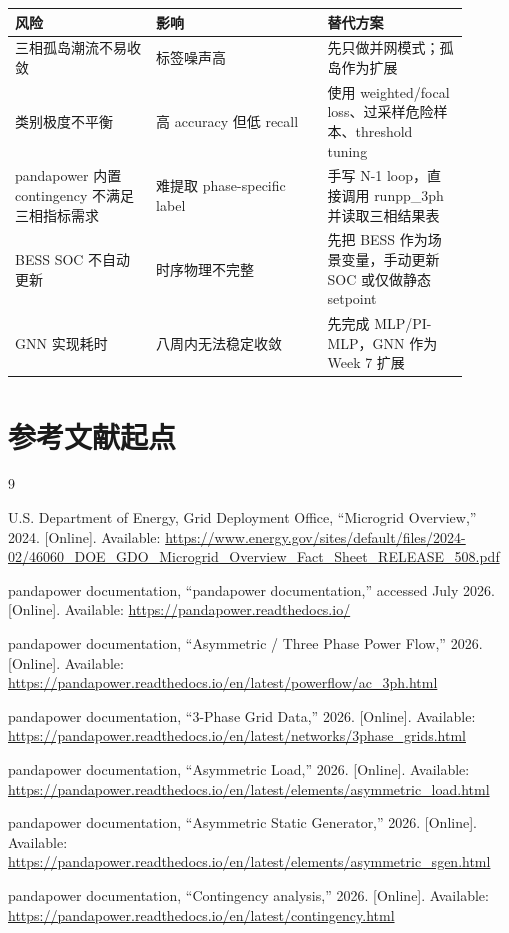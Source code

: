 \documentclass[UTF8,11pt]{ctexart}
\begin{document}
\begin{center}
\begin{tabular}{>{\raggedright\arraybackslash}p{0.28\linewidth}>{\raggedright\arraybackslash}p{0.34\linewidth}>{\raggedright\arraybackslash}p{0.28\linewidth}}
\toprule
风险 & 影响 & 替代方案 \\
\midrule
三相孤岛潮流不易收敛 & 标签噪声高 & 先只做并网模式；孤岛作为扩展 \\
类别极度不平衡 & 高 accuracy 但低 recall & 使用 weighted/focal loss、过采样危险样本、threshold tuning \\
pandapower 内置 contingency 不满足三相指标需求 & 难提取 phase-specific label & 手写 N-1 loop，直接调用 runpp\_3ph 并读取三相结果表 \\
BESS SOC 不自动更新 & 时序物理不完整 & 先把 BESS 作为场景变量，手动更新 SOC 或仅做静态 setpoint \\
GNN 实现耗时 & 八周内无法稳定收敛 & 先完成 MLP/PI-MLP，GNN 作为 Week 7 扩展 \\
\bottomrule
\end{tabular}
\end{center}

\section{参考文献起点}

\begin{thebibliography}{9}

U.S. Department of Energy, Grid Deployment Office, ``Microgrid Overview,'' 2024. [Online]. Available: \url{https://www.energy.gov/sites/default/files/2024-02/46060_DOE_GDO_Microgrid_Overview_Fact_Sheet_RELEASE_508.pdf}

pandapower documentation, ``pandapower documentation,'' accessed July 2026. [Online]. Available: \url{https://pandapower.readthedocs.io/}

pandapower documentation, ``Asymmetric / Three Phase Power Flow,'' 2026. [Online]. Available: \url{https://pandapower.readthedocs.io/en/latest/powerflow/ac_3ph.html}

pandapower documentation, ``3-Phase Grid Data,'' 2026. [Online]. Available: \url{https://pandapower.readthedocs.io/en/latest/networks/3phase_grids.html}

pandapower documentation, ``Asymmetric Load,'' 2026. [Online]. Available: \url{https://pandapower.readthedocs.io/en/latest/elements/asymmetric_load.html}

pandapower documentation, ``Asymmetric Static Generator,'' 2026. [Online]. Available: \url{https://pandapower.readthedocs.io/en/latest/elements/asymmetric_sgen.html}

pandapower documentation, ``Contingency analysis,'' 2026. [Online]. Available: \url{https://pandapower.readthedocs.io/en/latest/contingency.html}

\end{thebibliography}
\end{document}
